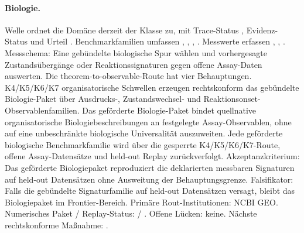 \paragraph{Biologie.}
Welle  ordnet die Domäne derzeit der Klasse  zu, mit Trace-Status , Evidenz-Status  und Urteil .
Benchmarkfamilien umfassen , \allowbreak {}, \allowbreak {}, \allowbreak {}.
Messwerte erfassen , \allowbreak {}, \allowbreak {}.
Messschema: Eine gebündelte biologische Spur wählen und vorhergesagte Zustandsübergänge oder Reaktionssignaturen gegen offene Assay-Daten auswerten.
Die theorem-to-observable-Route hat vier Behauptungen. K4/K5/K6/K7 organisatorische Schwellen erzeugen rechtskonform das gebündelte Biologie-Paket über Ausdrucks-, Zustandswechsel- und Reaktionsonset-Observablenfamilien. Das geförderte Biologie-Paket bindet quellnative organisatorische Biologiebeschreibungen an festgelegte Assay-Observablen, ohne auf eine unbeschränkte biologische Universalität auszuweiten. Jede geförderte biologische Benchmarkfamilie wird über die gesperrte K4/K5/K6/K7-Route, offene Assay-Datensätze und held-out Replay zurückverfolgt.
Akzeptanzkriterium: Das geförderte Biologiepaket reproduziert die deklarierten messbaren Signaturen auf held-out Datensätzen ohne Ausweitung der Behauptungsgrenze.
Falsifikator: Falls die gebündelte Signaturfamilie auf held-out Datensätzen versagt, bleibt das Biologiepaket im Frontier-Bereich.
Primäre Rout-Institutionen: NCBI GEO.
Numerisches Paket / Replay-Status:  / .
Offene Lücken: keine.
Nächste rechtskonforme Maßnahme: .

